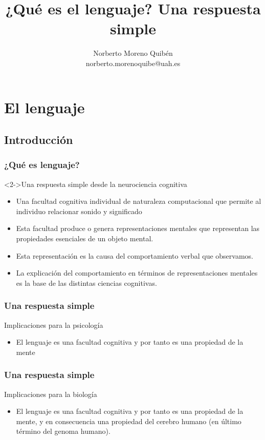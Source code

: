 \documentclass[compress]{beamer}
\title{¿Qué es el lenguaje? Una respuesta simple}
\author{Norberto Moreno Quibén\\
	       norberto.morenoquibe@uah.es}
\date{}
\begin{document}
\section{El lenguaje}
\subsection{Introducción}

\begin{frame}
  \titlepage
\end{frame}



 	\begin{frame}

 \frametitle{¿Qué es lenguaje?}

\begin{alertblock}<2->{Una respuesta simple desde la neurociencia cognitiva}
  \begin{itemize}
	  \item<3->%
Una facultad cognitiva individual de naturaleza computacional que permite al individuo relacionar sonido y significado
\item<4->%
Esta facultad produce o \alert{genera} representaciones mentales que representan las propiedades esenciales de un objeto mental.
\item<5->%
Esta representación es la causa del comportamiento verbal que observamos.
\item<6->La explicación del comportamiento en términos de representaciones mentales es la base de las distintas ciencias cognitivas.
  \end{itemize}
\end{alertblock}

 \end{frame}


	\begin{frame}
	  \frametitle{Una respuesta simple}
	\begin{alertblock}{Implicaciones para la psicología}
	\begin{itemize}
	\item<2->%
	El lenguaje es una facultad cognitiva y por tanto es una \alert{propiedad de la mente}
	\end{itemize}
	
	\end{alertblock}
	\end{frame}


	\begin{frame}
	  \frametitle{Una respuesta simple}
	\begin{alertblock}{Implicaciones para la biología}
		\begin{itemize}
		\item<2->%
		El lenguaje es una facultad cognitiva y por tanto es una propiedad de la mente, y en consecuencia una \alert{propiedad del cerebro humano} (en último término del genoma humano).
		\end{itemize}
		
	\end{alertblock}
	\end{frame}
\end{document}
